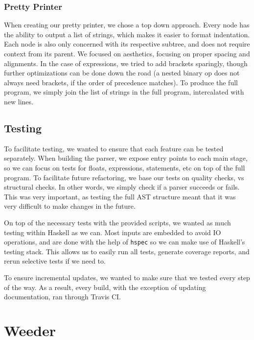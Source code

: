 \documentclass[11pt]{article}
\begin{document}
\subsubsection{Pretty Printer}
When creating our pretty printer, we chose a top down approach.  Every
node has the ability to output a list of strings, which makes it
easier to format indentation. Each node is also only concerned with
its respective subtree, and does not require context from its
parent. We focused on aesthetics, focusing on proper spacing and
alignments. In the case of expressions, we tried to add brackets
sparingly, though further optimizations can be done down the road (a
nested binary op does not always need brackets, if the order of
precedence matches). To produce the full program, we simply join the
list of strings in the full program, intercalated with new lines.

\subsection{Testing}

To facilitate testing, we wanted to ensure that each feature can be
tested separately.  When building the parser, we expose entry points
to each main stage, so we can focus on tests for floats, expressions,
statements, etc on top of the full program.  To facilitate future
refactoring, we base our tests on quality checks, vs structural
checks.  In other words, we simply check if a parser succeeds or
fails.  This was very important, as testing the full AST structure
meant that it was very difficult to make changes in the future.

On top of the necessary tests with the provided scripts, we wanted as
much testing within Haskell as we can. Most inputs are embedded to
avoid IO operations, and are done with the help of \texttt{hspec} so
we can make use of Haskell's testing stack. This allows us to easily
run all tests, generate coverage reports, and rerun selective tests if
we need to.

To ensure incremental updates, we wanted to make sure that we tested
every step of the way. As a result, every build, with the exception of
updating documentation, ran through Travis CI.

\section{Weeder}
\end{document}
